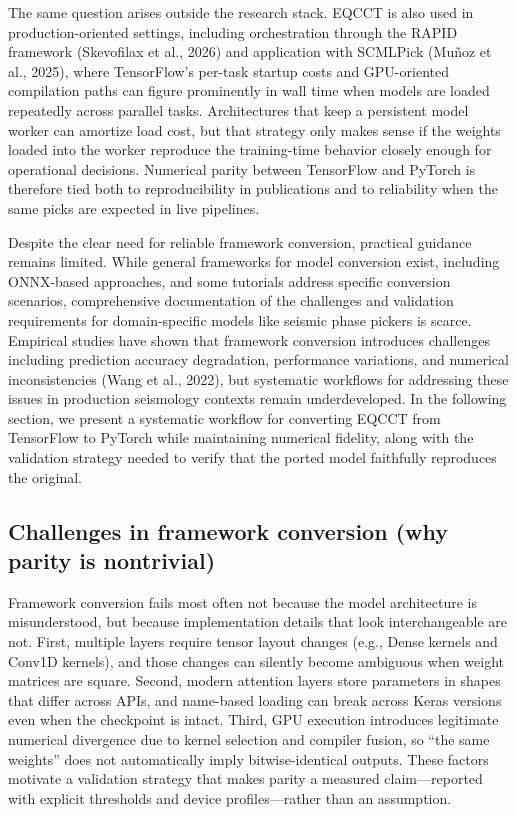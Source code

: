 The same question arises outside the research stack. EQCCT is also used in production-oriented settings, including orchestration through the RAPID framework (Skevofilax et al., 2026) and application with SCMLPick (Muñoz et al., 2025), where TensorFlow's per-task startup costs and GPU-oriented compilation paths can figure prominently in wall time when models are loaded repeatedly across parallel tasks. Architectures that keep a persistent model worker can amortize load cost, but that strategy only makes sense if the weights loaded into the worker reproduce the training-time behavior closely enough for operational decisions. Numerical parity between TensorFlow and PyTorch is therefore tied both to reproducibility in publications and to reliability when the same picks are expected in live pipelines.

Despite the clear need for reliable framework conversion, practical guidance remains limited. While general frameworks for model conversion exist, including ONNX-based approaches, and some tutorials address specific conversion scenarios, comprehensive documentation of the challenges and validation requirements for domain-specific models like seismic phase pickers is scarce. Empirical studies have shown that framework conversion introduces challenges including prediction accuracy degradation, performance variations, and numerical inconsistencies (Wang et al., 2022), but systematic workflows for addressing these issues in production seismology contexts remain underdeveloped. In the following section, we present a systematic workflow for converting EQCCT from TensorFlow to PyTorch while maintaining numerical fidelity, along with the validation strategy needed to verify that the ported model faithfully reproduces the original.

\subsection{Challenges in framework conversion (why parity is nontrivial)}

Framework conversion fails most often not because the model architecture is misunderstood, but because implementation details that look interchangeable are not. First, multiple layers require tensor layout changes (e.g., Dense kernels and Conv1D kernels), and those changes can silently become ambiguous when weight matrices are square. Second, modern attention layers store parameters in shapes that differ across APIs, and name-based loading can break across Keras versions even when the checkpoint is intact. Third, GPU execution introduces legitimate numerical divergence due to kernel selection and compiler fusion, so ``the same weights'' does not automatically imply bitwise-identical outputs. These factors motivate a validation strategy that makes parity a measured claim---reported with explicit thresholds and device profiles---rather than an assumption.

